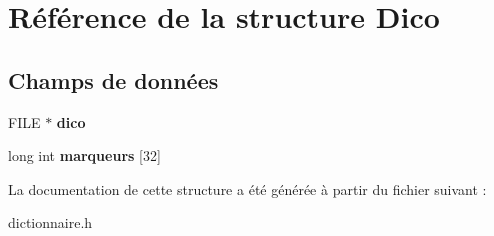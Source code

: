 \hypertarget{structDico}{\section{Référence de la structure Dico}
\label{structDico}
}
\subsection*{Champs de données}
\begin{DoxyCompactItemize}
\item 
\hypertarget{structDico_aa608808df162aebf2b2bfbc4723cfad6}{F\-I\-L\-E $\ast$ {\bfseries dico}}\label{structDico_aa608808df162aebf2b2bfbc4723cfad6}

\item 
\hypertarget{structDico_a1a8a33881f938f4ddd946edc97ae82f8}{long int {\bfseries marqueurs} \mbox{[}32\mbox{]}}\label{structDico_a1a8a33881f938f4ddd946edc97ae82f8}

\end{DoxyCompactItemize}


La documentation de cette structure a été générée à partir du fichier suivant \-:\begin{DoxyCompactItemize}
\item 
dictionnaire.\-h\end{DoxyCompactItemize}
